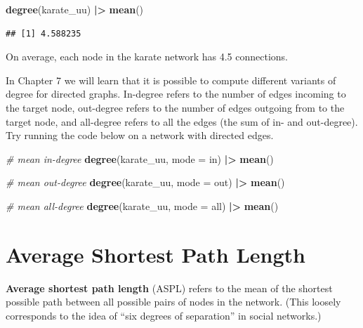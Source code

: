 \documentclass[
]{book}
\newenvironment{Shaded}{\begin{snugshade}}{\end{snugshade}}
\newcommand{\AttributeTok}[1]{\textcolor[rgb]{0.13,0.29,0.53}{#1}}
\newcommand{\CommentTok}[1]{\textcolor[rgb]{0.56,0.35,0.01}{\textit{#1}}}
\newcommand{\FunctionTok}[1]{\textcolor[rgb]{0.13,0.29,0.53}{\textbf{#1}}}
\newcommand{\NormalTok}[1]{#1}
\newcommand{\SpecialCharTok}[1]{\textcolor[rgb]{0.81,0.36,0.00}{\textbf{#1}}}
\newcommand{\StringTok}[1]{\textcolor[rgb]{0.31,0.60,0.02}{#1}}
\begin{document}
\begin{Shaded}
\begin{Highlighting}[]
\FunctionTok{degree}\NormalTok{(karate\_uu) }\SpecialCharTok{|\textgreater{}} \FunctionTok{mean}\NormalTok{()}
\end{Highlighting}
\end{Shaded}

\begin{verbatim}
## [1] 4.588235
\end{verbatim}

On average, each node in the karate network has 4.5 connections.

In Chapter 7 we will learn that it is possible to compute different variants of degree for directed graphs. In-degree refers to the number of edges incoming to the target node, out-degree refers to the number of edges outgoing from to the target node, and all-degree refers to all the edges (the sum of in- and out-degree). Try running the code below on a network with directed edges.

\begin{Shaded}
\begin{Highlighting}[]
\CommentTok{\# mean in{-}degree}
\FunctionTok{degree}\NormalTok{(karate\_uu, }\AttributeTok{mode =} \StringTok{\textquotesingle{}in\textquotesingle{}}\NormalTok{) }\SpecialCharTok{|\textgreater{}} \FunctionTok{mean}\NormalTok{()}

\CommentTok{\# mean out{-}degree}
\FunctionTok{degree}\NormalTok{(karate\_uu, }\AttributeTok{mode =} \StringTok{\textquotesingle{}out\textquotesingle{}}\NormalTok{) }\SpecialCharTok{|\textgreater{}} \FunctionTok{mean}\NormalTok{()}

\CommentTok{\# mean all{-}degree}
\FunctionTok{degree}\NormalTok{(karate\_uu, }\AttributeTok{mode =} \StringTok{\textquotesingle{}all\textquotesingle{}}\NormalTok{) }\SpecialCharTok{|\textgreater{}} \FunctionTok{mean}\NormalTok{()}
\end{Highlighting}
\end{Shaded}

\section{Average Shortest Path Length}\label{average-shortest-path-length}

\textbf{Average shortest path length} (ASPL) refers to the mean of the shortest possible path between all possible pairs of nodes in the network. (This loosely corresponds to the idea of ``six degrees of separation'' in social networks.)
\end{document}
